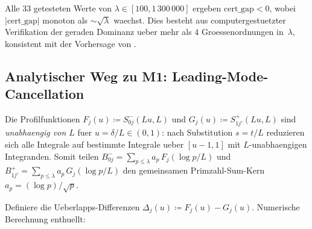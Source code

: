 \documentclass[12pt,a4paper]{article}
\theoremstyle{definition}
\theoremstyle{remark}
\begin{document}
\noindent Alle $33$ getesteten Werte von $\lambda \in [100, 1\,300\,000]$ ergeben $\mathrm{cert\_gap} < 0$, wobei $|\mathrm{cert\_gap}|$ monoton als $\sim\!\sqrt{\lambda}$ waechst. Dies besteht aus computergestuetzter Verifikation der geraden Dominanz ueber mehr als $4$ Groessenordnungen in~$\lambda$, konsistent mit der Vorhersage von .

\subsection{Analytischer Weg zu M1: Leading-Mode-Cancellation}
\label{sec:leading-mode}

Die Profilfunktionen $F_j(u) \coloneqq S^-_{0j}(Lu, L)$ und $G_j(u) \coloneqq S^+_{1j'}(Lu, L)$ sind \emph{unabhaengig von $L$} fuer $u = \delta/L \in (0,1)$: nach Substitution $s = t/L$ reduzieren sich alle Integrale auf bestimmte Integrale ueber $[u-1, 1]$ mit $L$-unabhaengigen Integranden. Somit teilen $B_{0j}^- = \sum_{p \leq \lambda} a_p\, F_j(\log p/L)$ und $B_{1j'}^+ = \sum_{p \leq \lambda} a_p\, G_j(\log p/L)$ den gemeinsamen Primzahl-Sum-Kern $a_p = (\log p)/\sqrt{p}$.

Definiere die Ueberlapps-Differenzen $\Delta_j(u) \coloneqq F_j(u) - G_j(u)$. Numerische Berechnung enthuellt:
\end{document}
